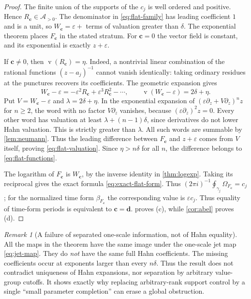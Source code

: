 \documentclass[11pt,a4paper]{article}
\numberwithin{equation}{section}
\theoremstyle{definition}
\theoremstyle{remark}
\newtheorem{remark}[remark]{Remark}
\newcommand{\A}{\mathcal A}
\newcommand{\eps}{\varepsilon}
\newcommand{\val}{\operatorname{v}}
\begin{document}
\begin{proof}
The finite union of the supports of the $c_j$ is well ordered and positive.
Hence $R_{\mathbf c}\in\A_{>0}$.  The denominator in
\eqref{eq:flat-family} has leading coefficient $1$ and is a unit, so
$W_{\mathbf c}=\eps+$ terms of valuation greater than $\delta$.
The exponential theorem places $F_{\mathbf c}$ in the stated stratum.
For $\mathbf c=0$ the vector field is constant, and its exponential is
exactly $z+\eps$.

If $\mathbf c\ne0$, then
$\val(R_{\mathbf c})=\eta$.  Indeed, a nontrivial linear combination of
the rational functions $(z-a_j)^{-1}$ cannot vanish identically: taking
ordinary residues at the punctures recovers its coefficients.
The geometric expansion gives
\begin{equation}\label{eq:Wflat-difference}
 W_{\mathbf c}-\eps=-\eps^2R_{\mathbf c}
                    +\eps^3R_{\mathbf c}^2-\cdots,
 \qquad\val(W_{\mathbf c}-\eps)=2\delta+\eta.
\end{equation}
Put $V=W_{\mathbf c}-\eps$ and $\lambda=2\delta+\eta$.
In the exponential expansion of $(\eps\partial_z+V\partial_z)^n z$
for $n\geq2$, the word with no factor $V\partial_z$ vanishes, because
$(\eps\partial_z)^2z=0$.  Every other word has valuation at least
$\lambda+(n-1)\delta$, since derivatives do not lower Hahn valuation.
This is strictly greater than $\lambda$.  All such words are summable
by \cref{lem:neumann}.  Thus the leading difference between
$F_{\mathbf c}$ and $z+\eps$ comes from $V$ itself, proving
\eqref{eq:flat-valuation}.  Since $\eta>n\delta$ for all $n$, the
difference belongs to \eqref{eq:flat-functions}.

The logarithm of $F_{\mathbf c}$ is $W_{\mathbf c}$, by the inverse
identity in \cref{thm:logexp}.  Taking its reciprocal gives the exact
formula \eqref{eq:exact-flat-form}.  Thus $(2\pi i)^{-1}\oint_{\gamma_j}\Omega_{F_{\mathbf c}}=c_j$;
for the normalized time form $\beta_{F_{\mathbf c}}$ the corresponding
value is $\eps c_j$.
Thus equality of time-form periods is equivalent to
$\mathbf c=\mathbf d$.   proves (c), while
\cref{cor:abel} proves (d).
\end{proof}

\begin{remark}[A failure of separated one-scale information, not of Hahn equality]
All the maps in the theorem have the same image under the one-scale jet map
\eqref{eq:jet-map}.  They do \emph{not} have the same full Hahn coefficients.
The missing coefficients occur at exponents larger than every $n\delta$.
Thus the result does not contradict uniqueness of Hahn expansions, nor
separation by arbitrary value-group cutoffs.  It shows exactly why replacing
arbitrary-rank support control by a single ``small parameter completion''
can erase a global obstruction.
\end{remark}
\end{document}
